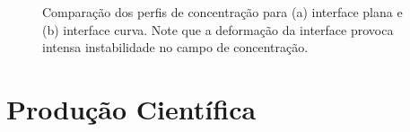 \documentclass[a4paper,portuges,12pt]{article}
\begin{document}
 \begin{figure}[h]
 	\begin{center}
 		\hspace{0.7cm}
 	\end{center}
	\caption{Comparação dos perfis de concentração para (a) interface plana
	e (b) interface curva. Note que a deformação da interface provoca
	intensa instabilidade no campo de concentração.} 
	\label{fig:chem3} 
 \end{figure}

\section{Produção Científica}
\end{document}
